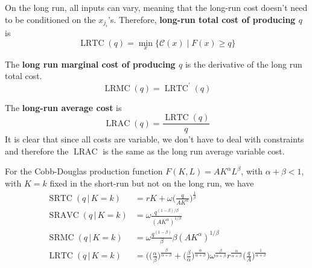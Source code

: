 \documentclass{article}
\DeclareMathOperator{\SRTC}{SRTC}
\DeclareMathOperator{\SRMC}{SRMC}
\DeclareMathOperator{\SRAVC}{SRAVC}
\DeclareMathOperator{\LRTC}{LRTC}
\DeclareMathOperator{\LRMC}{LRMC}
\DeclareMathOperator{\LRAC}{LRAC}
\begin{document}
      \begin{definition}
        \label{def:long-run-total-cost}
        On the long run, all inputs can vary, meaning that the long-run cost doesn't need to be conditioned on the $x_{j_i}$'s. Therefore, \textbf{long-run total cost of producing $q$} is 
        \begin{equation}
          \LRTC (q) = \min_{x} \{\mathcal{C}(x)\;|\; F(x) \geq q\}
        \end{equation}
      \end{definition}

      \begin{definition}
        \label{def:long-run-marginal-cost}
        The \textbf{long run marginal cost of producing $q$} is the derivative of the long run total cost. 
        \begin{equation}
          \LRMC (q) = \LRTC^\prime (q)
        \end{equation}
      \end{definition}

      \begin{definition}
        \label{def:long-run-average-cost}
        The \textbf{long-run average cost} is 
        \begin{equation}
          \LRAC (q) = \frac{\LRTC(q)}{q}
        \end{equation}
        It is clear that since all costs are variable, we don't have to deal with constraints and therefore the $\LRAC$ is the same as the long run average variable cost. 
      \end{definition}

      \begin{example}
        \label{ex:cobb-douglas-2}
        For the Cobb-Douglas production function $F(K, L) = A K^\alpha L^\beta$, with $\alpha + \beta < 1$, with $K=k$ fixed in the short-run but not on the long run, we have
        \begin{align*}
          \SRTC(q\,|\,K=k) & = r K + \omega \bigg(\frac{q}{A K^\alpha} \bigg)^{\frac{1}{\beta}} \\
          \SRAVC(q\,|\,K=k) & = \omega \frac{q^{(1-\beta)/\beta}}{(A K^\alpha)^{1/\beta}} \\
          \SRMC(q\,|\,K=k) & = \omega \frac{q^{(1 - \beta)}}{\beta}{\beta (A K^\alpha)^{1/\beta}} \\
          \LRTC(q\,|\,K=k) & = \Bigg( \Big(\frac{\alpha}{\beta}\Big)^{\frac{\beta}{\alpha + \beta}} + \Big(\frac{\beta}{\alpha}\Big)^{\frac{\alpha}{\alpha + \beta}} \Bigg) \omega^{\frac{\beta}{\alpha + \beta}} r^{\frac{\alpha}{\alpha + \beta}} \bigg(\frac{q}{A}\bigg)^{\frac{1}{\alpha + \beta}}
        \end{align*}
      \end{example}
\end{document}
